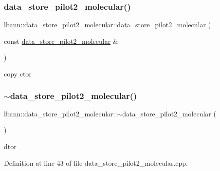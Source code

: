\subsubsection{\texorpdfstring{data\+\_\+store\+\_\+pilot2\+\_\+molecular()}{data\_store\_pilot2\_molecular()}\hspace{0.1cm}{\footnotesize\ttfamily [2/2]}}
{\footnotesize\ttfamily lbann\+::data\+\_\+store\+\_\+pilot2\+\_\+molecular\+::data\+\_\+store\+\_\+pilot2\+\_\+molecular (\begin{DoxyParamCaption}\item[{const \hyperlink{classlbann_1_1data__store__pilot2__molecular}{data\+\_\+store\+\_\+pilot2\+\_\+molecular} \&}]{ }\end{DoxyParamCaption})\hspace{0.3cm}{\ttfamily [default]}}



copy ctor 

\mbox{\label{classlbann_1_1data__store__pilot2__molecular_a73f7d920f8f8174af4c2cec984fee7e6}} 
\subsubsection{\texorpdfstring{$\sim$data\+\_\+store\+\_\+pilot2\+\_\+molecular()}{~data\_store\_pilot2\_molecular()}}
{\footnotesize\ttfamily lbann\+::data\+\_\+store\+\_\+pilot2\+\_\+molecular\+::$\sim$data\+\_\+store\+\_\+pilot2\+\_\+molecular (\begin{DoxyParamCaption}{ }\end{DoxyParamCaption})\hspace{0.3cm}{\ttfamily [override]}}



dtor 



Definition at line 43 of file data\+\_\+store\+\_\+pilot2\+\_\+molecular.\+cpp.



